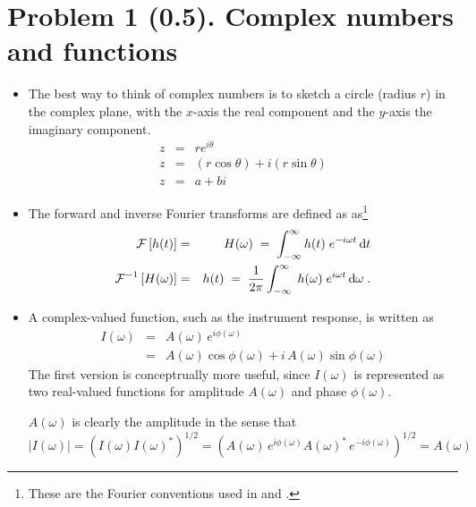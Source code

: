\documentclass[11pt,titlepage,fleqn]{article}
\newcommand{\fft}{h}
\newcommand{\ffw}{H}
\begin{document}

\pagebreak
\section*{Problem 1 (0.5). Complex numbers and functions}

\begin{itemize}
\item The best way to think of complex numbers is to sketch a circle (radius $r$) in the complex plane, with the $x$-axis the real component and the $y$-axis the imaginary component.
%
\begin{eqnarray*}
z &=& r e^{i\theta}
\\
z &=& (r\cos\theta) + i(r\sin\theta)
\\
z &=& a + bi
\end{eqnarray*}



\item The forward and inverse Fourier transforms are defined as as\footnote{These are the Fourier conventions used in \citet[][p.~109]{DT} and \citet[][Section 6.4.2]{SteinWysession}.}
%
\begin{eqnarray}
\cF \left[ \fft(t) \right] &=& \ffw(\omega)
\;=\; \int_{-\infty}^{\infty} \fft(t) \; e^{-i\omega t} \,\rmd t
\label{fft}
\\
\cF^{-1} \left[ \ffw(\omega) \right] &=& \fft(t) 
\;=\; \frac{1}{2\pi} \int_{-\infty}^{\infty} \; \fft(\omega) \; e^{i\omega t} \,\rmd\omega 
\label{ifft}
\;.
\end{eqnarray}


\item A complex-valued function, such as the instrument response, is written as
%
\begin{eqnarray}
I(\omega) &=& A(\omega)\,e^{i\phi(\omega)}
\\
&=& A(\omega)\cos\phi(\omega) + i\,A(\omega)\sin\phi(\omega)
\end{eqnarray}
%
The first version is conceptrually more useful, since $I(\omega)$ is represented as two real-valued functions for amplitude $A(\omega)$ and phase $\phi(\omega)$.

$A(\omega)$ is clearly the amplitude in the sense that
%
\begin{equation}
|I(\omega)| = \left( I(\omega) I(\omega)^* \right)^{1/2}
= \left( A(\omega)\,e^{i\phi(\omega)} A(\omega)^*\,e^{-i\phi(\omega)} \right)^{1/2}
= A(\omega)
\end{equation}

\end{itemize}
\end{document}
